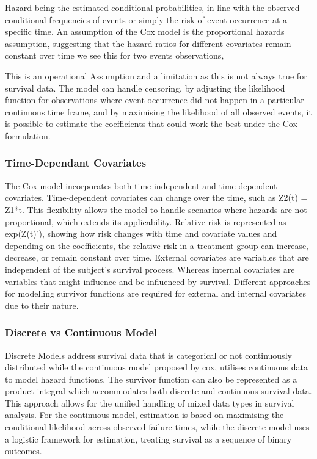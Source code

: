 Hazard being the estimated conditional probabilities, in line with the observed conditional frequencies of events or simply the risk of event occurrence at a specific time. An assumption of the Cox model is the proportional hazards assumption, suggesting that the hazard ratios for different covariates remain constant over time we see this for two events observations,


This is an operational Assumption and a limitation as this is not always true for survival data. The model can handle censoring, by adjusting the likelihood function for observations where event occurrence did not happen in a particular continuous time frame, and by maximising the likelihood of all observed events, it is possible to estimate the coefficients that could work the best under the Cox formulation.


\subsubsection{Time-Dependant Covariates}
\noindent
The Cox model incorporates both time-independent and time-dependent covariates. Time-dependent covariates can change over the time, such as Z2(t) = Z1*t. This flexibility allows the model to handle scenarios where hazards are not proportional, which extends its applicability. Relative risk is represented as exp(Z(t)'), showing how risk changes with time and covariate values and depending on the coefficients, the relative risk in a treatment group can increase, decrease, or remain constant over time. External covariates are variables that are independent of the subject’s survival process. Whereas internal covariates are variables that might influence and be influenced by survival. Different approaches for modelling survivor functions are required for external and internal covariates due to their nature.

\subsubsection{Discrete vs Continuous Model}
\noindent
Discrete Models address survival data that is categorical or not continuously distributed while the continuous model proposed by cox, utilises continuous data to model hazard functions. The survivor function can also be represented as a product integral which accommodates both discrete and continuous survival data. This approach allows for the unified handling of mixed data types in survival analysis. For the continuous model, estimation is based on maximising the conditional likelihood across observed failure times, while the discrete model uses a logistic framework for estimation, treating survival as a sequence of binary outcomes.

